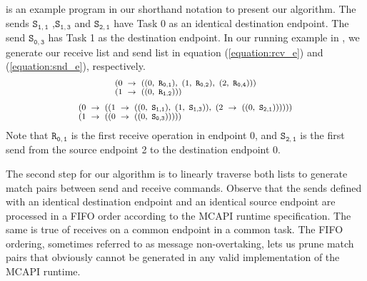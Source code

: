  is an example program in our shorthand notation to present our algorithm. The sends $\mathtt{S_{1,1}}$ ,$\mathtt{S_{1,3}}$ and $\mathtt{S_{2,1}}$ have Task 0 as an identical destination endpoint. The send $\mathtt{S_{0,3}}$ has Task 1 as the destination endpoint. In our running example in , we generate our receive list and send list in equation (\ref{equation:rcv_e}) and (\ref{equation:snd_e}), respectively.
\begin{equation}
\footnotesize \begin{array}{l}
(0\ \rightarrow\ ((0,\ \mathtt{R_{0,1}}),\ (1,\ \mathtt{R_{0,2}}),\ (2,\ \mathtt{R_{0,4}})))\\
(1\ \rightarrow\ ((0,\ \mathtt{R_{1,2}})))\\
\end{array}
\label{equation:rcv_e}
\end{equation}
\begin{equation}
\footnotesize \begin{array}{l}
(0\ \rightarrow\ ((1\ \rightarrow\ ((0,\ \mathtt{S_{1,1}}),\ (1,\ \mathtt{S_{1,3}})),\ (2\ \rightarrow\ ((0,\ \mathtt{S_{2,1}}))))))\\
(1\ \rightarrow\ ((0\ \rightarrow\ ((0,\ \mathtt{S_{0,3}})))))\\
\end{array}
\label{equation:snd_e}
\end{equation}
Note that $\mathtt{R_{0,1}}$ is the first receive operation in endpoint 0, and $\mathtt{S_{2,1}}$ is the first send from the source endpoint 2 to the destination endpoint 0.

The second step for our algorithm is to linearly traverse both lists to generate match pairs between send and receive commands. Observe that the sends defined with an identical destination endpoint and an identical source endpoint are processed in a FIFO order according to the MCAPI runtime specification. The same is true of receives on a common endpoint in a common task. The FIFO ordering, sometimes referred to as message non-overtaking, lets us prune match pairs that obviously cannot be generated in any valid implementation of the MCAPI runtime.


